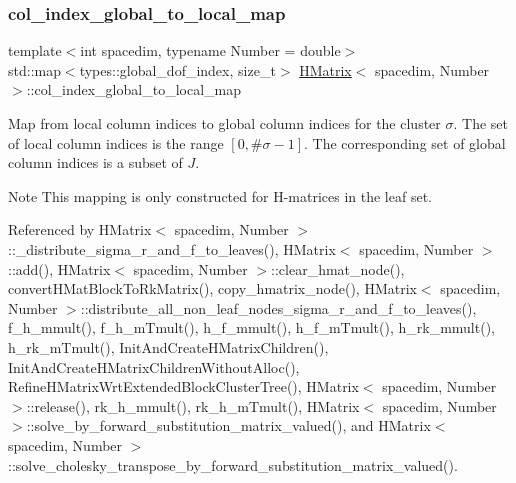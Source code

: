 \mbox{\label{classHMatrix_ab337c7b4f2f40699b9b7f3ab17a1e056}} 
\subsubsection{\texorpdfstring{col\+\_\+index\+\_\+global\+\_\+to\+\_\+local\+\_\+map}{col\_index\_global\_to\_local\_map}}
{\footnotesize\ttfamily template$<$int spacedim, typename Number = double$>$ \\
std\+::map$<$types\+::global\+\_\+dof\+\_\+index, size\+\_\+t$>$ \hyperlink{classHMatrix}{H\+Matrix}$<$ spacedim, Number $>$\+::col\+\_\+index\+\_\+global\+\_\+to\+\_\+local\+\_\+map\hspace{0.3cm}{\ttfamily [private]}}

Map from local column indices to global column indices for the cluster $\sigma$. The set of local column indices is the range $[0, \#\sigma - 1]$. The corresponding set of global column indices is a subset of $J$.


\begin{DoxyDescription}
\item[Note ]This mapping is only constructed for H-\/matrices in the leaf set. 
\end{DoxyDescription}

Referenced by H\+Matrix$<$ spacedim, Number $>$\+::\+\_\+distribute\+\_\+sigma\+\_\+r\+\_\+and\+\_\+f\+\_\+to\+\_\+leaves(), H\+Matrix$<$ spacedim, Number $>$\+::add(), H\+Matrix$<$ spacedim, Number $>$\+::clear\+\_\+hmat\+\_\+node(), convert\+H\+Mat\+Block\+To\+Rk\+Matrix(), copy\+\_\+hmatrix\+\_\+node(), H\+Matrix$<$ spacedim, Number $>$\+::distribute\+\_\+all\+\_\+non\+\_\+leaf\+\_\+nodes\+\_\+sigma\+\_\+r\+\_\+and\+\_\+f\+\_\+to\+\_\+leaves(), f\+\_\+h\+\_\+mmult(), f\+\_\+h\+\_\+m\+Tmult(), h\+\_\+f\+\_\+mmult(), h\+\_\+f\+\_\+m\+Tmult(), h\+\_\+rk\+\_\+mmult(), h\+\_\+rk\+\_\+m\+Tmult(), Init\+And\+Create\+H\+Matrix\+Children(), Init\+And\+Create\+H\+Matrix\+Children\+Without\+Alloc(), Refine\+H\+Matrix\+Wrt\+Extended\+Block\+Cluster\+Tree(), H\+Matrix$<$ spacedim, Number $>$\+::release(), rk\+\_\+h\+\_\+mmult(), rk\+\_\+h\+\_\+m\+Tmult(), H\+Matrix$<$ spacedim, Number $>$\+::solve\+\_\+by\+\_\+forward\+\_\+substitution\+\_\+matrix\+\_\+valued(), and H\+Matrix$<$ spacedim, Number $>$\+::solve\+\_\+cholesky\+\_\+transpose\+\_\+by\+\_\+forward\+\_\+substitution\+\_\+matrix\+\_\+valued().

